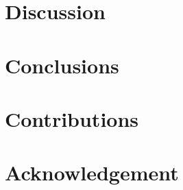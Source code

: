 \documentclass[12pt, a4paper]{article}
\begin{document}
\section{Discussion}

\section{Conclusions}

\section*{Contributions}

\section*{Acknowledgement}

\newpage

\singlespacing

\printbibliography

\newpage
\end{document}
